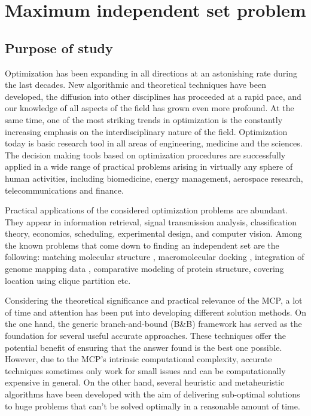 \chapter{Maximum independent set problem}
\section{Purpose of study}
Optimization has been expanding in all directions at an astonishing rate during
the last decades. New algorithmic and theoretical techniques have been developed,
the diffusion into other disciplines has proceeded at a rapid pace, and our knowledge
of all aspects of the field has grown even more profound. At the same time,
one of the most striking trends in optimization is the constantly increasing emphasis on the interdisciplinary nature of the field. Optimization today is
basic research
tool in all areas of engineering, medicine and the sciences. The decision making tools
based on optimization procedures are successfully applied in a wide range of practical
problems arising in virtually any sphere of human activities, including biomedicine,
energy management, aerospace research, telecommunications and finance.

Practical applications of the considered optimization problems are abundant.
They appear in information retrieval, signal transmission analysis, classification
theory, economics, scheduling, experimental design, and computer vision. Among the known problems 
that come down to finding an independent set are the following: 
matching molecular structure \cite{molecular_matching}, 
macromolecular docking \cite{molecular_docking},
integration of genome mapping data \cite{genome_mapping}, 
comparative modeling of protein structure\cite{modeling_protein_structure}, covering location using clique partition \cite{butenko_applications} etc.

Considering the theoretical significance and practical relevance of the MCP, a lot of time and attention has been put into developing different solution methods. On the one hand, the generic branch-and-bound (B\&B) framework has served as the foundation for several useful accurate approaches. These techniques offer the potential benefit of ensuring that the answer found is the best one possible. However, due to the MCP's intrinsic computational complexity, accurate techniques sometimes only work for small issues and can be computationally expensive in general. On the other hand, several heuristic and metaheuristic algorithms have been developed with the aim of delivering sub-optimal solutions to huge problems that can't be solved optimally in a reasonable amount of time.

